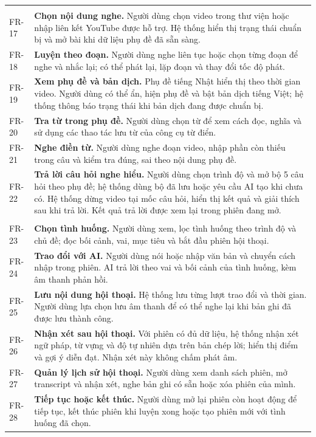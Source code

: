 \begin{longtable}{@{}>{\raggedright\arraybackslash}p{3.4cm}p{12cm}@{}}
  \multicolumn{2}{@{}l}{\textbf{4. Nghe và Shadowing}}\\*
  FR-17 & \textbf{Chọn nội dung nghe.} Người dùng chọn video trong thư viện hoặc nhập liên kết YouTube được hỗ trợ. Hệ thống hiển thị trạng thái chuẩn bị và mở bài khi dữ liệu phụ đề đã sẵn sàng. \\
  FR-18 & \textbf{Luyện theo đoạn.} Người dùng nghe liên tục hoặc chọn từng đoạn để nghe và nhắc lại; có thể phát lại, lặp đoạn và thay đổi tốc độ phát. \\
  FR-19 & \textbf{Xem phụ đề và bản dịch.} Phụ đề tiếng Nhật hiển thị theo thời gian video. Người dùng có thể ẩn, hiện phụ đề và bật bản dịch tiếng Việt; hệ thống thông báo trạng thái khi bản dịch đang được chuẩn bị. \\
  FR-20 & \textbf{Tra từ trong phụ đề.} Người dùng chọn từ để xem cách đọc, nghĩa và sử dụng các thao tác lưu từ của công cụ từ điển. \\
  FR-21 & \textbf{Nghe điền từ.} Người dùng nghe đoạn video, nhập phần còn thiếu trong câu và kiểm tra đúng, sai theo nội dung phụ đề. \\
  FR-22 & \textbf{Trả lời câu hỏi nghe hiểu.} Người dùng chọn trình độ và mở bộ 5 câu hỏi theo phụ đề; hệ thống dùng bộ đã lưu hoặc yêu cầu AI tạo khi chưa có. Hệ thống dừng video tại mốc câu hỏi, hiển thị kết quả và giải thích sau khi trả lời. Kết quả trả lời được xem lại trong phiên đang mở. \\
  \midrule

  \multicolumn{2}{@{}l}{\textbf{5. Hội thoại với AI}}\\*
  FR-23 & \textbf{Chọn tình huống.} Người dùng xem, lọc tình huống theo trình độ và chủ đề; đọc bối cảnh, vai, mục tiêu và bắt đầu phiên hội thoại. \\
  FR-24 & \textbf{Trao đổi với AI.} Người dùng nói hoặc nhập văn bản và chuyển cách nhập trong phiên. AI trả lời theo vai và bối cảnh của tình huống, kèm âm thanh phản hồi. \\
  FR-25 & \textbf{Lưu nội dung hội thoại.} Hệ thống lưu từng lượt trao đổi và thời gian. Người dùng lựa chọn lưu âm thanh để có thể nghe lại khi bản ghi đã được lưu thành công. \\
  FR-26 & \textbf{Nhận xét sau hội thoại.} Với phiên có đủ dữ liệu, hệ thống nhận xét ngữ pháp, từ vựng và độ tự nhiên dựa trên bản chép lời; hiển thị điểm và gợi ý diễn đạt. Nhận xét này không chấm phát âm. \\
  FR-27 & \textbf{Quản lý lịch sử hội thoại.} Người dùng xem danh sách phiên, mở transcript và nhận xét, nghe bản ghi có sẵn hoặc xóa phiên của mình. \\
  FR-28 & \textbf{Tiếp tục hoặc kết thúc.} Người dùng mở lại phiên còn hoạt động để tiếp tục, kết thúc phiên khi luyện xong hoặc tạo phiên mới với tình huống đã chọn. \\
  \midrule


\end{longtable}
